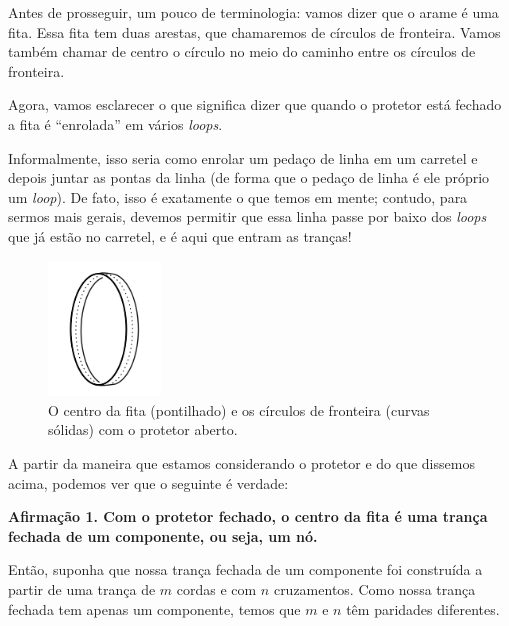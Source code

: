 	\par\vspace{0.3cm} Antes de prosseguir, um pouco de terminologia: vamos dizer que o arame é uma fita. 
	Essa fita tem duas arestas, que chamaremos de círculos de fronteira. Vamos também chamar de centro o 
	círculo no meio do caminho entre os círculos de fronteira. 
	
	\par\vspace{0.3cm} Agora, vamos esclarecer o que significa dizer que quando o protetor está fechado 
	a fita é ``enrolada'' em vários \textit{loops}.
	
	\par\vspace{0.3cm} Informalmente, isso seria como enrolar um pedaço de linha em um carretel e depois 
	juntar as pontas da linha (de forma que o pedaço de linha é ele próprio um \textit{loop}). De fato, 
	isso é exatamente o que temos em mente; contudo, para sermos mais gerais, devemos permitir que essa 
	linha passe por baixo dos \textit{loops} que já estão no carretel, e é aqui que entram as tranças! 
	\begin{figure}[H]
		\begin{center}
			\includegraphics[width=3cm]{Images/fita.png}
		\end{center}
		\caption{O centro da fita (pontilhado) e os círculos de fronteira (curvas sólidas) com o protetor aberto.}
	\end{figure}
	\par\vspace{0.3cm} A partir da maneira que estamos considerando o protetor e do que dissemos acima, 
	podemos ver que o seguinte é verdade:
	\begin{center}
		\textbf{Afirmação 1. Com o protetor fechado, o centro da fita é uma trança fechada de um componente, 
		ou seja, um nó.}
	\end{center}
	\par\vspace{0.3cm} Então, suponha que nossa trança fechada de um componente foi construída a partir 
	de uma trança de $m$ cordas e com $n$ cruzamentos. Como nossa trança fechada tem apenas um componente, 
	temos que $m$ e $n$ têm paridades diferentes.
	
